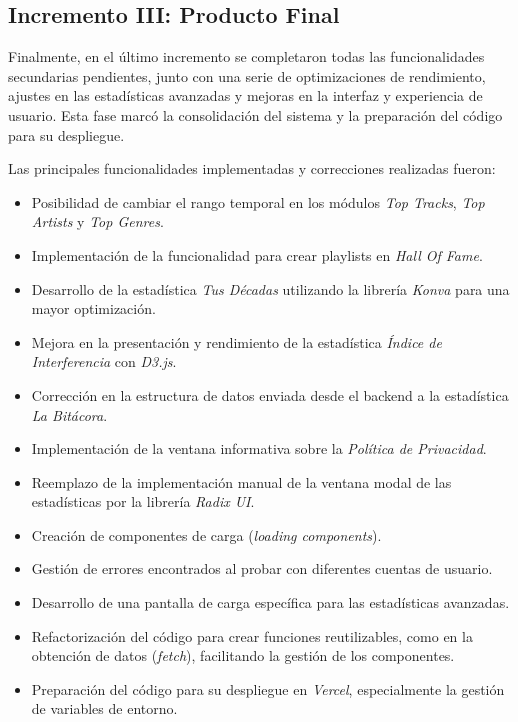 \subsection*{Incremento III: Producto Final}

Finalmente, en el último incremento se completaron todas las funcionalidades secundarias pendientes, junto con una serie de optimizaciones de rendimiento, ajustes en las estadísticas avanzadas y mejoras en la interfaz y experiencia de usuario. Esta fase marcó la consolidación del sistema y la preparación del código para su despliegue.

Las principales funcionalidades implementadas y correcciones realizadas fueron:

\setlength{\itemsep}{0pt}
\begin{itemize}
    \item Posibilidad de cambiar el rango temporal en los módulos \textit{Top Tracks}, \textit{Top Artists} y \textit{Top Genres}.
    \item Implementación de la funcionalidad para crear playlists en \textit{Hall Of Fame}.
    \item Desarrollo de la estadística \textit{Tus Décadas} utilizando la librería \textit{Konva} para una mayor optimización.
    \item Mejora en la presentación y rendimiento de la estadística \textit{Índice de Interferencia} con \textit{D3.js}.
    \item Corrección en la estructura de datos enviada desde el backend a la estadística \textit{La Bitácora}.
    \item Implementación de la ventana informativa sobre la \textit{Política de Privacidad}.
    \item Reemplazo de la implementación manual de la ventana modal de las estadísticas por la librería \textit{Radix UI}.
    \item Creación de componentes de carga (\textit{loading components}).
    \item Gestión de errores encontrados al probar con diferentes cuentas de usuario.
    \item Desarrollo de una pantalla de carga específica para las estadísticas avanzadas.
    \item Refactorización del código para crear funciones reutilizables, como en la obtención de datos (\textit{fetch}), facilitando la gestión de los componentes.
    \item Preparación del código para su despliegue en \textit{Vercel}, especialmente la gestión de variables de entorno.
\end{itemize}

